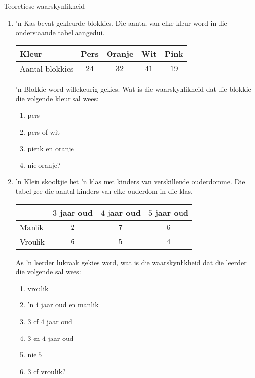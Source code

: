 \begin{exercises}{Teoretiese waarskynlikheid}
  \begin{enumerate}[itemsep=5pt, label=\textbf{\arabic*}]
  \item  'n Kas bevat gekleurde blokkies. Die aantal van elke kleur word in die onderstaande tabel aangedui.

    \begin{center}
      \begin{tabular}{lcccc}
        \toprule
        Kleur & Pers & Oranje & Wit & Pink \\
        \midrule
        Aantal blokkies & $24$ & $32$ & $41$ & $19$ \\
        \bottomrule
      \end{tabular}
    \end{center}

    'n Blokkie word willekeurig gekies. Wat is die waarskynlikheid dat die blokkie die volgende kleur sal wees:
    \begin{enumerate}
    \item pers
    \item pers of wit
    \item pienk en oranje
    \item nie oranje?
    \end{enumerate}

  \item 'n Klein skooltjie het 'n klas met kinders van verskillende ouderdomme. Die tabel gee die aantal kinders van elke ouderdom in die klas.

    \begin{center}
      \begin{tabular}{lccc}
        \toprule
               & $3$ jaar oud & $4$ jaar oud& $5$ jaar oud \\
       \midrule
        Manlik   & $2$ & $7$ & $6$ \\
        Vroulik & $6$ & $5$ & $4$ \\
        \bottomrule
      \end{tabular}
    \end{center}

    As 'n leerder lukraak gekies word, wat is die waarskynlikheid dat die leerder die volgende sal wees:
    \begin{enumerate}
    \item vroulik
    \item 'n $4$ jaar oud en manlik 
    \item $3$ of $4$ jaar oud
    \item $3$ en $4$ jaar oud
    \item nie $5$
    \item $3$ of vroulik?
    \end{enumerate}


\end{enumerate}
\end{exercises}
